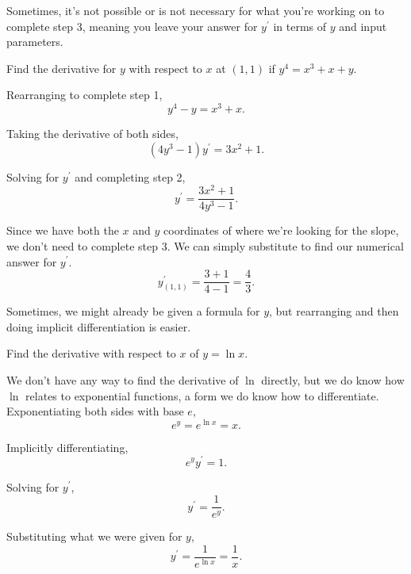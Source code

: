 Sometimes, it's not possible or is not necessary for what you're working on to complete step 3, meaning you leave your answer for $y^\prime$ in terms of $y$ and input parameters.
\begin{example}
	Find the derivative for $y$ with respect to $x$ at $(1,1)$ if $y^4 = x^3 + x + y$.
\end{example}
\begin{answer}
	Rearranging to complete step 1,
	\begin{equation*}
		y^4 - y = x^3 + x.
	\end{equation*}
	
	Taking the derivative of both sides,
	\begin{equation*}
		(4y^3 - 1)y^\prime = 3x^2 + 1.
	\end{equation*}
	
	Solving for $y^\prime$ and completing step 2,
	\begin{equation*}
		y^\prime = \frac{3x^2 + 1}{4y^3 - 1}.
	\end{equation*}
	
	Since we have both the $x$ and $y$ coordinates of where we're looking for the slope, we don't need to complete step 3.
	We can simply substitute to find our numerical answer for $y^\prime$.
	\begin{equation*}
		y^\prime_{(1,1)} = \frac{3 + 1}{4 - 1} = \frac{4}{3}.
	\end{equation*}
\end{answer}

Sometimes, we might already be given a formula for $y$, but rearranging and then doing implicit differentiation is easier.
\begin{example}
	Find the derivative with respect to $x$ of $y = \ln{x}$.
\end{example}
\begin{answer}
	We don't have any way to find the derivative of $\ln$ directly, but we do know how $\ln$ relates to exponential functions, a form we do know how to differentiate.
	Exponentiating both sides with base $e$,
	\begin{equation*}
		e^y = e^{\ln{x}} = x.
	\end{equation*}
	 
	Implicitly differentiating,
	\begin{equation*}
		e^{y}y^\prime = 1.
	\end{equation*}
	
	Solving for $y^\prime$,
	\begin{equation*}
		y^\prime = \frac{1}{e^y}.
	\end{equation*}
	
	Substituting what we were given for $y$,
	\begin{equation*}
		y^\prime = \frac{1}{e^{\ln{x}}} = \frac{1}{x}.
	\end{equation*}
\end{answer}

